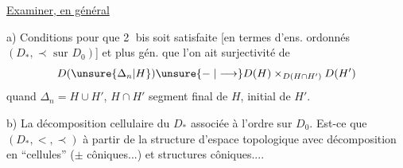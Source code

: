 \uline{Examiner, en général}

a) Conditions pour que \textcircled{2 bis} soit satisfaite [en termes d'ens. ordonnés $(D_*,\prec\text{ sur }D_0)$] et plus gén. que l'on ait surjectivité de
\[
D(\unsure{\Delta_n|H})\unsure{\mathrel{-}|\longrightarrow}D(H)\mathbin{\times}_{D(H\cap H')}D(H')
\]
quand $\Delta_n=H\cup H'$, $H\cap H'$ segment final de $H$, initial de $H'$.

b) La décomposition cellulaire du \margin{$\Vert$} $D_*$ associée à l'ordre sur $D_0$. Est-ce que   $(D_*,<,\prec)$
à partir de la structure d'espace topologique  avec décomposition en ``cellules'' ($\pm$ côniques...) et structures côniques....
